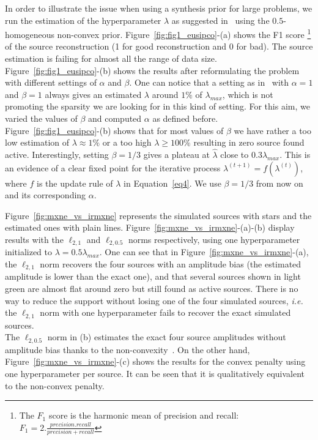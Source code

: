 In order to illustrate the issue when using a synthesis prior for large problems, we run the estimation of the hyperparameter $\lambda$ as suggested in~\cite{Figueiredo} using the $0.5$-homogeneous non-convex prior. Figure~\ref{fig:fig1_eusipco}-(a) shows the F1 score \footnote{The $F_1$ score is the harmonic mean of precision and recall: $F_1=2.\frac{precision . recall}{precision + recall}$} of the source reconstruction (1 for good reconstruction and 0 for bad). The source estimation is failing for almost all the range of data size. Figure~\ref{fig:fig1_eusipco}-(b) shows the results after reformulating the problem with different settings of $\alpha$ and $\beta$. One can notice that a setting as in~\cite{Figueiredo} with $\alpha=1$ and $\beta=1$ always gives an estimated $\lambda$ around $1\%$ of $\lambda_{max}$, which is not promoting the sparsity we are looking for in this kind of setting. For this aim, we varied the values of $\beta$ and computed $\alpha$ as defined before. Figure~\ref{fig:fig1_eusipco}-(b) shows that for most values of $\beta$ we have rather a too low estimation of $\lambda\approx 1\%$ or a too high $\lambda\geq 100\%$ resulting in zero source found active. Interestingly, setting $\beta=1/3$ gives a plateau at $\hat{\lambda}$ close to $0.3\lambda_{max}$. This is an evidence of a clear fixed point for the iterative process $\lambda^{(t+1)}=f(\lambda^{(t)})$, where $f$ is the update rule of $\lambda$ in Equation~\eqref{eq4}. We use $\beta=1/3$ from now on and its corresponding $\alpha$.

Figure~\ref{fig:mxne_vs_irmxne} represents the simulated sources with stars and the estimated ones with plain lines. Figure~\ref{fig:mxne_vs_irmxne}-(a)-(b) display results with the $\ell_{2,1}$ and $\ell_{2,0.5}$ norms respectively, using one hyperparameter initialized to $\lambda=0.5\lambda_{max}$. One can see that in Figure~\ref{fig:mxne_vs_irmxne}-(a), the $\ell_{2,1}$ norm recovers the four sources with an amplitude bias (the estimated amplitude is lower than the exact one), and that several sources shown in light green are almost flat around zero but still found as active sources. There is no way to reduce the support without losing one of the four simulated sources, \textit{i.e.} the $\ell_{2,1}$ norm with one hyperparameter fails to recover the exact simulated sources.\\
The $\ell_{2,0.5}$ norm in (b) estimates the exact four source amplitudes without amplitude bias thanks to the non-convexity~\cite{strohmeier-etal:16}. On the other hand, Figure~\ref{fig:mxne_vs_irmxne}-(c) shows the results for the convex penalty using one hyperparameter per source. It can be seen that it is qualitatively equivalent to the non-convex penalty. \\

